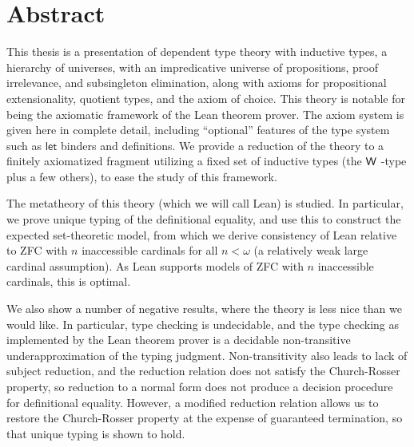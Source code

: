 \section*{Abstract}

This thesis is a presentation of dependent type theory with inductive types, a hierarchy of universes, with an impredicative universe of propositions, proof irrelevance, and subsingleton elimination, along with axioms for propositional extensionality, quotient types, and the axiom of choice. This theory is notable for being the axiomatic framework of the Lean theorem prover. The axiom system is given here in complete detail, including ``optional'' features of the type system such as $\mathsf{let}$ binders and definitions. We provide a reduction of the theory to a finitely axiomatized fragment utilizing a fixed set of inductive types (the $\mathsf{W}$ -type plus a few others), to ease the study of this framework.

The metatheory of this theory (which we will call Lean) is studied. In particular, we prove unique typing of the definitional equality, and use this to construct the expected set-theoretic model, from which we derive consistency of Lean relative to ZFC with $n$ inaccessible cardinals for all $n<\omega$ (a relatively weak large cardinal assumption). As Lean supports models of ZFC with $n$ inaccessible cardinals, this is optimal.

We also show a number of negative results, where the theory is less nice than we would like. In particular, type checking is undecidable, and the type checking as implemented by the Lean theorem prover is a decidable non-transitive underapproximation of the typing judgment. Non-transitivity also leads to lack of subject reduction, and the reduction relation does not satisfy the Church-Rosser property, so reduction to a normal form does not produce a decision procedure for definitional equality. However, a modified reduction relation allows us to restore the Church-Rosser property at the expense of guaranteed termination, so that unique typing is shown to hold.
